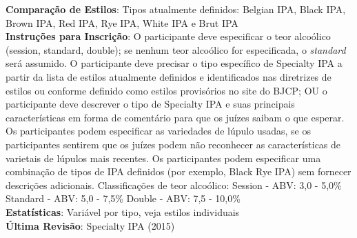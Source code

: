 \textbf{Comparação de Estilos}: Tipos atualmente definidos: Belgian IPA, Black IPA, Brown IPA, Red IPA, Rye IPA, White IPA e Brut IPA \\
\textbf{Instruções para Inscrição}: O participante deve especificar o teor alcoólico (session, standard, double); se nenhum teor alcoólico for especificada, o \textit{standard} será assumido. O participante deve precisar o tipo específico de Specialty IPA a partir da lista de estilos atualmente definidos e identificados nas diretrizes de estilos ou conforme definido como estilos provisórios no site do BJCP; OU o participante deve descrever o tipo de Specialty IPA e suas principais características em forma de comentário para que os juízes saibam o que esperar. Os participantes podem especificar as variedades de lúpulo usadas, se os participantes sentirem que os juízes podem não reconhecer as características de varietais de lúpulos mais recentes. Os participantes podem especificar uma combinação de tipos de IPA definidos (por exemplo, Black Rye IPA) sem fornecer descrições adicionais. Classificações de teor alcoólico: Session - ABV: 3,0 - 5,0\% Standard - ABV: 5,0 - 7,5\% Double - ABV: 7,5 - 10,0\% \\
\textbf{Estatísticas}: Variável por tipo, veja estilos individuais \\
\textbf{Última Revisão}: Specialty IPA (2015)